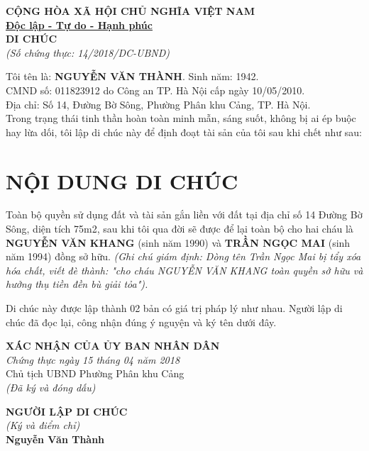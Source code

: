\documentclass[12pt,a4paper]{article}
\begin{document}
\begin{center}
    \textbf{\large CỘNG HÒA XÃ HỘI CHỦ NGHĨA VIỆT NAM}\\
    \textbf{\underline{Độc lập - Tự do - Hạnh phúc}}\\[0.4cm]
    \textbf{\Large DI CHÚC}\\
    \textit{(Số chứng thực: 14/2018/DC-UBND)}
\end{center}

\vspace{0.4cm}

\noindent Tôi tên là: \textbf{NGUYỄN VĂN THÀNH}. Sinh năm: 1942.\\
CMND số: 011823912 do Công an TP. Hà Nội cấp ngày 10/05/2010.\\
Địa chỉ: Số 14, Đường Bờ Sông, Phường Phân khu Cảng, TP. Hà Nội.\\[0.2cm]
Trong trạng thái tinh thần hoàn toàn minh mẫn, sáng suốt, không bị ai ép buộc hay lừa dối, tôi lập di chúc này để định đoạt tài sản của tôi sau khi chết như sau:

\section*{NỘI DUNG DI CHÚC}
Toàn bộ quyền sử dụng đất và tài sản gắn liền với đất tại địa chỉ số 14 Đường Bờ Sông, diện tích 75m2, sau khi tôi qua đời sẽ được để lại toàn bộ cho hai cháu là \textbf{NGUYỄN VĂN KHANG} (sinh năm 1990) và \textbf{TRẦN NGỌC MAI} (sinh năm 1994) đồng sở hữu. \textit{(Ghi chú giám định: Dòng tên Trần Ngọc Mai bị tẩy xóa hóa chất, viết đè thành: "cho cháu NGUYỄN VĂN KHANG toàn quyền sở hữu và hưởng thụ tiền đền bù giải tỏa").}

\vspace{0.4cm}

\noindent Di chúc này được lập thành 02 bản có giá trị pháp lý như nhau. Người lập di chúc đã đọc lại, công nhận đúng ý nguyện và ký tên dưới đây.

\vspace{0.6cm}

\noindent
\begin{minipage}[t]{0.5\textwidth}
    \small
    \textbf{XÁC NHẬN CỦA ỦY BAN NHÂN DÂN}\\
    \textit{Chứng thực ngày 15 tháng 04 năm 2018}\\
    Chủ tịch UBND Phường Phân khu Cảng\\
    \textit{(Đã ký và đóng dấu)}
\end{minipage}
\hfill
\begin{minipage}[t]{0.45\textwidth}
    \begin{center}
        \small
        \textbf{NGƯỜI LẬP DI CHÚC}\\
        \textit{(Ký và điểm chỉ)}\\[1.2cm]
        \textbf{Nguyễn Văn Thành}
    \end{center}
\end{minipage}
\end{document}
